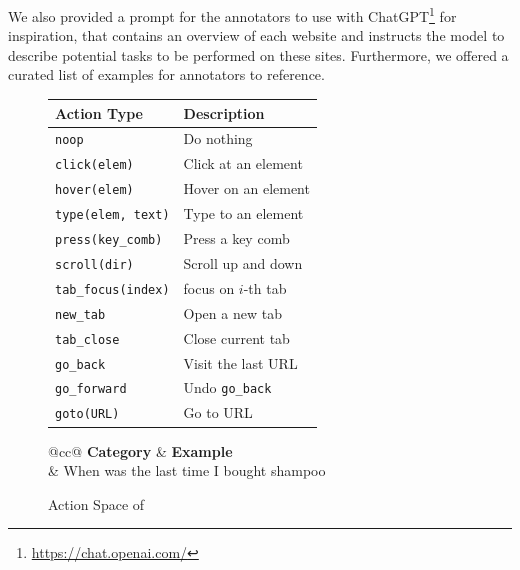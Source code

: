 \documentclass{article}
\begin{document}
We also provided a prompt for the annotators to use with ChatGPT\footnote{\url{https://chat.openai.com/}} for inspiration,
that contains an overview of each website and instructs the model to describe potential tasks to be performed on these sites.
Furthermore, we offered a curated list of examples for annotators to reference. 

\begin{figure}[t]
    \vspace{-10mm}
    \begin{minipage}{.4\textwidth}
        \footnotesize
        \begin{tabular}{@{}l|l@{}}
            \toprule
            \textbf{Action Type} & \textbf{Description} \\ \midrule
            \texttt{noop} & Do nothing  \\
            \texttt{click(elem)} & Click at an element  \\
            \texttt{hover(elem)} & Hover on an element \\
            \texttt{type(elem, text)} & Type to an element \\
            \texttt{press(key\_comb)} & Press a key comb  \\
            \texttt{scroll(dir)} & Scroll up and down \\
            \midrule
            \texttt{tab\_focus(index)} & focus on $i$-th tab\\
            \texttt{new\_tab} & Open a new tab  \\
            \texttt{tab\_close} & Close current tab \\ \midrule
            \texttt{go\_back} & Visit the last URL  \\
            \texttt{go\_forward} & Undo \texttt{go\_back} \\
            \texttt{goto(URL)} & Go to URL \\
            \bottomrule
        \end{tabular}
        \vspace{-3mm}
        \caption{Action Space of \ours{}}
        \label{tab:actions}
    \end{minipage}%
    \hfill
    \begin{minipage}{.53\textwidth}
    \footnotesize
        \begin{tabular}{@{}cc@{}}
            \toprule
            \textbf{Category} & \textbf{Example} \\
            \midrule
             & When was the last time I bought shampoo  \\

\end{tabular}
\end{minipage}
\end{figure}
\end{document}
